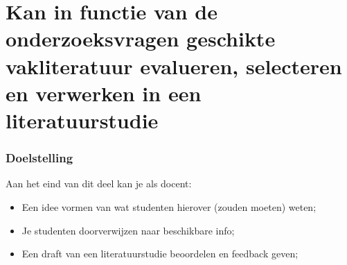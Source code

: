\section{\large Kan in functie van de onderzoeksvragen geschikte vakliteratuur evalueren, selecteren en verwerken in een literatuurstudie}

\sectionframelogo{}

\begin{frame}
  \frametitle{Doelstelling}
  
  Aan het eind van dit deel kan je als docent:
  
  \begin{itemize}
    \item Een idee vormen van wat studenten hierover (zouden moeten) weten;
    \item Je studenten doorverwijzen naar beschikbare info;
    \item Een draft van een literatuurstudie beoordelen en feedback geven;
  \end{itemize}
\end{frame}

